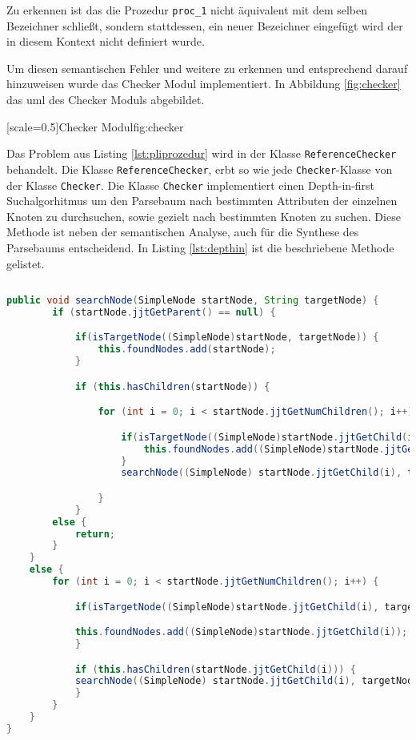 Zu erkennen ist das die Prozedur \verb+proc_1+ nicht äquivalent mit dem selben Bezeichner schließt, sondern stattdessen, ein neuer Bezeichner eingefügt wird der in diesem Kontext nicht definiert wurde.

Um diesen semantischen Fehler und weitere zu erkennen und entsprechend darauf hinzuweisen wurde das Checker Modul implementiert.
In Abbildung \ref{fig:checker} das \ac{uml} des Checker Moduls abgebildet.

[scale=0.5]{Checker Modul}{fig:checker}
\pagebreak

Das Problem aus Listing \ref{lst:pliprozedur} wird in der Klasse \verb+ReferenceChecker+ behandelt. Die Klasse \verb+ReferenceChecker+, erbt so wie jede \verb+Checker+-Klasse von der Klasse \verb+Checker+.
Die Klasse \verb+Checker+ implementiert einen Depth-in-first Suchalgorhitmus um den Parsebaum nach bestimmten Attributen der einzelnen Knoten zu durchsuchen, sowie gezielt nach bestimmten Knoten zu suchen. Diese Methode ist neben der semantischen Analyse, auch für die Synthese des Parsebaums entscheidend. 
In Listing \ref{lst:depthin} ist die beschriebene Methode gelistet.

 \begin{lstlisting}[language=Java, caption=Depth-In-first Suchalgorhitmus, label={lst:depthin}]
 
public void searchNode(SimpleNode startNode, String targetNode) {
		if (startNode.jjtGetParent() == null) {

			if(isTargetNode((SimpleNode)startNode, targetNode)) {
				this.foundNodes.add(startNode);
			}

			if (this.hasChildren(startNode)) {

				for (int i = 0; i < startNode.jjtGetNumChildren(); i++) {

					if(isTargetNode((SimpleNode)startNode.jjtGetChild(i), targetNode)) 	{
						this.foundNodes.add((SimpleNode)startNode.jjtGetChild(i));
					}		
					searchNode((SimpleNode) startNode.jjtGetChild(i), targetNode);

				}
			}
		else {
			return;
		}
	}
	else {
		for (int i = 0; i < startNode.jjtGetNumChildren(); i++) {

			if(isTargetNode((SimpleNode)startNode.jjtGetChild(i), targetNode)) {

			this.foundNodes.add((SimpleNode)startNode.jjtGetChild(i));
			}

			if (this.hasChildren(startNode.jjtGetChild(i))) {
			searchNode((SimpleNode) startNode.jjtGetChild(i), targetNode);
			}
		}
	}
}
\end{lstlisting}

